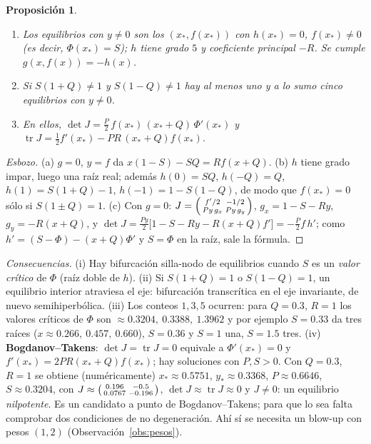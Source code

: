 \documentclass[11pt,a4paper,oneside]{book}
\newcommand{\tr}{\operatorname{tr}}
\theoremstyle{plain}
\newtheorem{proposicion}[teorema]{Proposición}
\theoremstyle{definition}
\theoremstyle{remark}
\begin{document}
\begin{proposicion}\label{prop:interior}
\begin{enumerate}[label=(\alph*)]
\item Los equilibrios con $y\ne0$ son los $(x_*,f(x_*))$ con $h(x_*)=0$, $f(x_*)\ne0$ (es decir, $\Phi(x_*)=S$); $h$ tiene grado $5$ y coeficiente principal $-R$. Se cumple $g(x,f(x))=-h(x)$.
\item Si $S(1+Q)\ne1$ y $S(1-Q)\ne1$ hay al menos uno y a lo sumo cinco equilibrios con $y\neq0$.
\item En ellos, $\det J=\tfrac P2\,f(x_*)\,(x_*+Q)\,\Phi'(x_*)$ y $\tr J=\tfrac12f'(x_*)-PR\,(x_*+Q)f(x_*)$.
\end{enumerate}
\end{proposicion}

\begin{proof}[Esbozo]
(a) $g=0$, $y=f$ da $x(1-S)-SQ=Rf(x+Q)$. (b) $h$ tiene grado impar, luego una raíz real; además $h(0)=SQ$, $h(-Q)=Q$, $h(1)=S(1+Q)-1$, $h(-1)=1-S(1-Q)$, de modo que $f(x_*)=0$ sólo si $S(1\pm Q)=1$. (c) Con $g=0$: $J=\begin{psmallmatrix}f'/2&-1/2\\Py\,g_x&Py\,g_y\end{psmallmatrix}$, $g_x=1-S-Ry$, $g_y=-R(x+Q)$, y $\det J=\tfrac{Py}2\big[1-S-Ry-R(x+Q)f'\big]=-\tfrac P2f\,h'$; como $h'=(S-\Phi)-(x+Q)\Phi'$ y $S=\Phi$ en la raíz, sale la fórmula.
\end{proof}

\emph{Consecuencias.} (i) Hay bifurcación silla-nodo de equilibrios cuando $S$ es un \emph{valor crítico} de $\Phi$ (raíz doble de $h$). (ii) Si $S(1+Q)=1$ o $S(1-Q)=1$, un equilibrio interior atraviesa el eje: bifurcación transcrítica en el eje invariante, de nuevo semihiperbólica. (iii) Los conteos $1,3,5$ ocurren: para $Q=0.3$, $R=1$ los valores críticos de $\Phi$ son $\approx0.3204,\ 0.3388,\ 1.3962$ y por ejemplo $S=0.33$ da tres raíces ($x\approx0.266,\ 0.457,\ 0.660$), $S=0.36$ y $S=1$ una, $S=1.5$ tres. (iv) \textbf{Bogdanov--Takens}: $\det J=\tr J=0$ equivale a $\Phi'(x_*)=0$ y $f'(x_*)=2PR(x_*+Q)f(x_*)$; hay soluciones con $P,S>0$. Con $Q=0.3$, $R=1$ se obtiene (numéricamente) $x_*\approx0.5751$, $y_*\approx0.3368$, $P\approx0.6646$, $S\approx0.3204$, con $J\approx\begin{psmallmatrix}0.196&-0.5\\0.0767&-0.196\end{psmallmatrix}$, $\det J\approx\tr J\approx0$ y $J\neq0$: un equilibrio \emph{nilpotente}. Es un candidato a punto de Bogdanov--Takens; para que lo sea falta comprobar dos condiciones de no degeneración. Ahí sí se necesita un blow-up con pesos $(1,2)$ (Observación~\ref{obs:pesos}).
\end{document}

